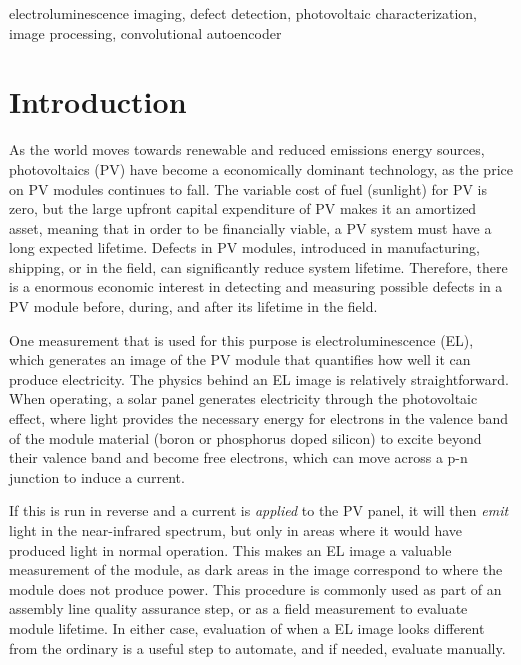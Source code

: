 \documentclass[conference]{IEEEtran}
\begin{document}
\begin{IEEEkeywords}
electroluminescence imaging, defect detection, photovoltaic characterization, image processing, convolutional autoencoder
\end{IEEEkeywords}

\section{Introduction}
As the world moves towards renewable and reduced emissions energy sources, photovoltaics (PV) have become a economically dominant technology, as the price on PV modules continues to fall. 
The variable cost of fuel (sunlight) for PV is zero, but the large upfront capital expenditure of PV makes it an amortized asset, meaning that in order to be financially viable, a PV system must have a long expected lifetime. 
Defects in PV modules, introduced in manufacturing, shipping, or in the field, can significantly reduce system lifetime. 
Therefore, there is a enormous economic interest in detecting and measuring possible defects in a PV module before, during, and after its lifetime in the field. 


One measurement that is used for this purpose is electroluminescence (EL), which generates an image of the PV module that quantifies how well it can produce electricity. 
The physics behind an EL image is relatively straightforward. 
When operating, a solar panel generates electricity through the photovoltaic effect, where light provides the necessary energy for electrons in the valence band of the module material (boron or phosphorus doped silicon) to excite beyond their valence band and become free electrons, which can move across a p-n junction to induce a current. 

If this is run in reverse and a current is \textit{applied} to the PV panel, it will then \textit{emit} light in the near-infrared spectrum, but only in areas where it would have produced light in normal operation. 
This makes an EL image a valuable measurement of the module, as dark areas in the image correspond to where the module does not produce power. 
This procedure is commonly used as part of an assembly line quality assurance step, or as a field measurement to evaluate module lifetime. 
In either case, evaluation of when a EL image looks different from the ordinary is a useful step to automate, and if needed, evaluate manually. 
\end{document}
